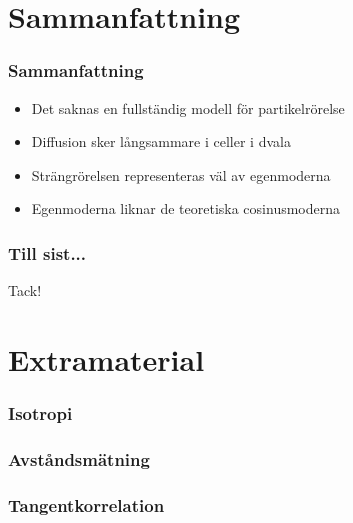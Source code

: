 \documentclass[swedish]{beamer}
\begin{document}
\section{Sammanfattning}
\begin{frame}
\frametitle{Sammanfattning}

\begin{itemize}[label={$\bullet$}]
    
 \item{Det saknas en fullständig modell för partikelrörelse}
\\[8mm]
 \item{Diffusion sker långsammare i celler i dvala}
\\[8mm]
 \item{Strängrörelsen representeras väl av egenmoderna}
\\[8mm]
\item{Egenmoderna liknar de teoretiska cosinusmoderna}

\end{itemize}

\end{frame}


\begin{frame}
\frametitle{Till sist...}
    \begin{center}
    \huge Tack! 
    \end{center}
\end{frame}

\section{Extramaterial}
\begin{frame}
\frametitle{Isotropi}
\begin{figure}
\resizebox{1\textwidth}{!}{  }
\end{figure}
\end{frame}

\begin{frame}
\frametitle{Avståndsmätning}

\begin{figure}
\resizebox{1\textwidth}{!}{  }
\end{figure}

\end{frame}

\begin{frame}
\frametitle{Tangentkorrelation}

\begin{figure}
\end{figure}

\end{frame}
\end{document}
